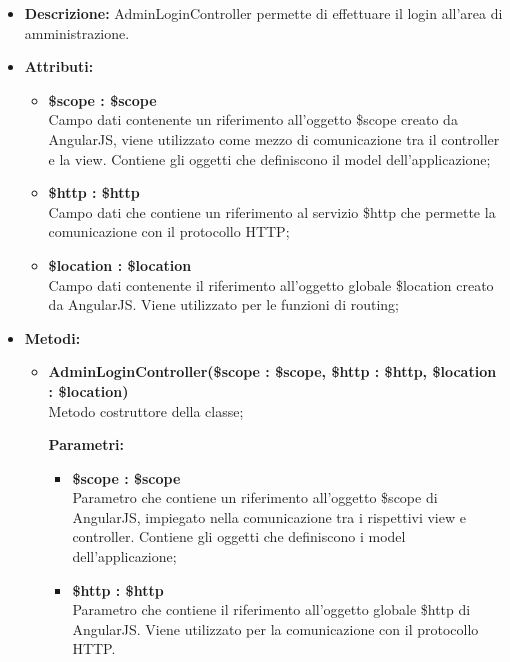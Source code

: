 \begin{itemize}
	\item \textbf{Descrizione:} AdminLoginController permette di effettuare il login all'area di amministrazione.
	\item \textbf{Attributi:}
	\begin{itemize}
		
		\item \textbf{\$scope : \$scope}\\
		Campo dati contenente un riferimento all'oggetto \$scope creato da AngularJS, viene utilizzato come mezzo di comunicazione tra il controller e la view. Contiene gli oggetti che definiscono il model dell'applicazione;
		
		\item \textbf{\$http : \$http }\\
		Campo dati che contiene un riferimento al servizio \$http che permette la comunicazione con il protocollo HTTP;
		
		\item \textbf{\$location : \$location }\\
		Campo dati contenente il riferimento all'oggetto globale \$location creato da AngularJS. Viene utilizzato per le funzioni di routing;
		
		
	\end{itemize}
	\item \textbf{Metodi:}
	\begin{itemize}
		
		\item \textbf{AdminLoginController(\$scope : \$scope, \$http : \$http, \$location : \$location)}\\
		Metodo costruttore della classe;
		\begin{description}
			\item[\textbf{Parametri:}]
		\end{description}
		\begin{itemize}
			\item \textbf{\$scope : \$scope}\\
			Parametro che contiene un riferimento all'oggetto \$scope di AngularJS, impiegato nella comunicazione tra i rispettivi view e controller. Contiene gli oggetti che definiscono i model dell'applicazione;
			
			\item \textbf{\$http : \$http}\\
			Parametro che contiene il riferimento all'oggetto globale \$http di AngularJS. Viene utilizzato per la comunicazione con il protocollo HTTP.
			

\end{itemize}
\end{itemize}
\end{itemize}
